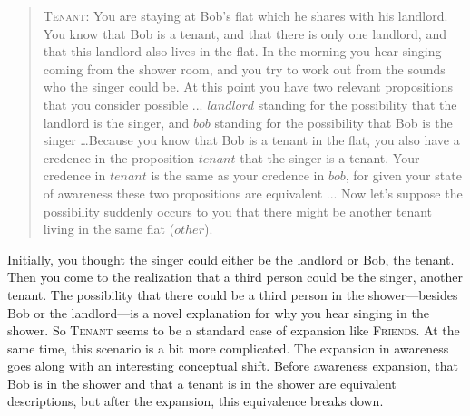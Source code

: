 \documentclass[
  11pt,
  dvipsnames,enabledeprecatedfontcommands]{scrartcl}
\begin{document}
\begin{quote}
\textsc{Tenant}: You are staying at Bob's flat which he shares with his landlord. You know that Bob is a tenant, and that there is only one landlord, and that this landlord also lives in the flat. In the morning you hear singing coming from the shower room, and you try to work out from the sounds who the singer could be. At this point you have two relevant propositions that you consider possible ... $landlord$ standing for the possibility that the landlord is the singer, and $bob$ standing for the possibility that Bob is the singer  \dots  Because you know that Bob is a tenant in the flat, you also have a credence in the proposition $tenant$ that the singer is a tenant. Your credence in $tenant$ is the same as your credence in $bob$, for given your state of awareness these two propositions are equivalent ... Now let's suppose the possibility suddenly occurs to you that there might be another tenant living in the same flat  ($other$).
\end{quote}

\doublespace

\noindent Initially, you thought the singer could either be the landlord
or Bob, the tenant. Then you come to the realization that a third person
could be the singer, another tenant. The possibility that there could be
a third person in the shower---besides Bob or the landlord---is a novel
explanation for why you hear singing in the shower. So \textsc{Tenant}
seems to be a standard case of expansion like \textsc{Friends}. At the
same time, this scenario is a bit more complicated. The expansion in
awareness goes along with an interesting conceptual shift. Before
awareness expansion, that Bob is in the shower and that a tenant is in
the shower are equivalent descriptions, but after the expansion, this
equivalence breaks down.
\end{document}
